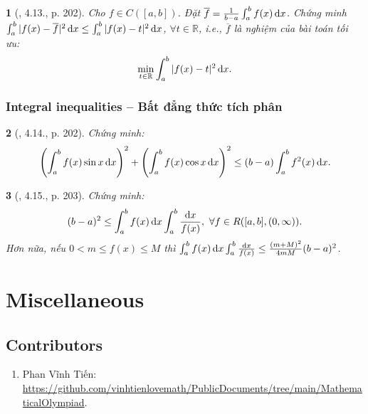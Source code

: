 \documentclass{article}
\newtheorem{baitoan}{}
\begin{document}
\begin{baitoan}[\cite{Quoc_Long_Dat_Nam_VMC}, 4.13., p. 202]
	Cho $f\in C([a,b])$. Đặt $\overline{f} = \frac{1}{b - a}\int_a^b f(x)\,{\rm d}x$. Chứng minh $\int_a^b |f(x) - \overline{f}|^2\,{\rm d}x\le\int_a^b |f(x) - t|^2\,{\rm d}x$, $\forall t\in\mathbb{R}$, i.e., $\overline{f}$ là nghiệm của bài toán tối ưu:
	\begin{equation*}
		\min_{t\in\mathbb{R}} \int_a^b |f(x) - t|^2\,{\rm d}x.
	\end{equation*}
\end{baitoan}

\subsubsection{Integral inequalities -- Bất đẳng thức tích phân}

\begin{baitoan}[\cite{Quoc_Long_Dat_Nam_VMC}, 4.14., p. 202]
	Chứng minh:
	\begin{equation*}
		\left(\int_a^b f(x)\sin x\,{\rm d}x\right)^2 + \left(\int_a^b f(x)\cos x\,{\rm d}x\right)^2\le(b - a)\int_a^b f^2(x)\,{\rm d}x.
	\end{equation*}
\end{baitoan}

\begin{baitoan}[\cite{Quoc_Long_Dat_Nam_VMC}, 4.15., p. 203]
	Chứng minh:
	\begin{equation*}
		(b - a)^2\le\int_a^b f(x)\,{\rm d}x\int_a^b \frac{{\rm d}x}{f(x)},\ \forall f\in R([a,b],(0,\infty)).
	\end{equation*}
	Hơn nữa, nếu $0 < m\le f(x)\le M$ thì $\int_a^b f(x)\,{\rm d}x\int_a^b \frac{{\rm d}x}{f(x)}\le\frac{(m + M)^2}{4mM}(b - a)^2$.
\end{baitoan}


\section{Miscellaneous}

\subsection{Contributors}

\begin{enumerate}
	\item {\sc Phan Vĩnh Tiến}: \url{https://github.com/vinhtienlovemath/PublicDocuments/tree/main/MathematicalOlympiad}.
\end{enumerate}


\printbibliography[heading=bibintoc]
	
\end{document}
